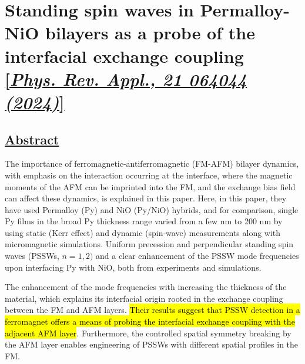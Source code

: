 \section{Standing spin waves in Permalloy-NiO bilayers as a probe of the interfacial exchange coupling \href{https://doi.org/10.1103/PhysRevApplied.21.064044}{[\textit{Phys. Rev. Appl., 21 064044 (2024)}]}}

\subsection*{\underline{Abstract}}
The importance of ferromagnetic-antiferromagnetic (FM-AFM) bilayer dynamics, with emphasis on the interaction occurring at the interface, where the magnetic moments of the AFM can be imprinted into the FM, and the exchange bias field can affect these dynamics, is explained in this paper. Here, in this paper, they have used Permalloy (Py) and NiO (Py/NiO) hybrids, and for comparison, single Py films in the broad Py thickness range varied from a few nm to 200 nm by using static (Kerr effect) and dynamic (spin-wave) measurements along with micromagnetic simulations. Uniform precession and perpendicular standing spin waves (PSSWs, $n=1, 2)$ and a clear enhancement of the PSSW mode frequencies upon interfacing Py with NiO, both from experiments and simulations.

\hspace{1cm}The enhancement of the mode frequencies with increasing the thickness of the material, which explains its interfacial origin rooted in the exchange coupling between the FM and AFM layers. \hl{Their results suggest that PSSW detection in a ferromagnet offers a means of probing the interfacial exchange coupling with the adjacent AFM layer}. Furthermore, the controlled spatial symmetry breaking by the AFM layer enables engineering of PSSWs with different spatial profiles in the FM.

